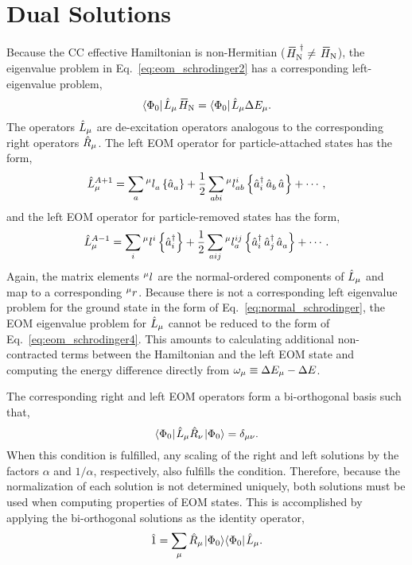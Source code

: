 \documentclass[thesis.tex]{subfiles}
\begin{document}
\section{Dual Solutions} \label{section:eom_dual}

Because the CC effective Hamiltonian is non-Hermitian ($\EHamN^{\dagger} \neq \EHamN$), the eigenvalue problem in Eq.\ \eqref{eq:eom_schrodinger2} has a corresponding left-eigenvalue problem,
\begin{equation} \label{eq:eom_dual1}
  \refbra\Lop_{\mu}\EHamN = \refbra\Lop_{\mu}\Ecorr_{\mu}.
\end{equation}
The operators $\hat{L}\hspace{-0.1pt}_{\mu}$ are de-excitation operators analogous to the corresponding right operators $\hat{R}\hspace{-0.1pt}_{\mu}$.  The left EOM operator for particle-attached states has the form,
\begin{equation} \label{eq:pa_left}
  \hat{L}\hspace{-0.1pt}^{A+1}_{\mu} = \sum_{a}{}^{\mu}l^{\hspace{0.1pt}}_{a}\left\{\mathop{\hat{a}^{}_{a}}\right\} + \frac{1}{2}\sum_{abi}{}^{\mu}l^{\hspace{0.1pt}i}_{ab}\left\{\mathop{\hat{a}^{\dagger}_{i}}\mathop{\hat{a}^{}_{b}}\mathop{\hat{a}^{}_{}}\right\} + \cdots,
\end{equation}
and the left EOM operator for particle-removed states has the form,
\begin{equation} \label{eq:pr_left}
  \hat{L}\hspace{-0.1pt}^{A-1}_{\mu} = \sum_{i}{}^{\mu}l^{\hspace{0.1pt}i}_{}\left\{\mathop{\hat{a}^{\dagger}_{i}}\right\} + \frac{1}{2}\sum_{aij}{}^{\mu}l^{\hspace{0.1pt}ij}_{a}\left\{\mathop{\hat{a}^{\dagger}_{i}}\mathop{\hat{a}^{\dagger}_{j}}\mathop{\hat{a}^{}_{a}}\right\} + \cdots.
\end{equation}
Again, the matrix elements ${}^{\mu}l^{\hspace{0.1pt}}_{}$ are the normal-ordered components of $\hat{L}\hspace{-0.1pt}_{\mu}$ and map to a corresponding ${}^{\mu}r^{}_{}$.  Because there is not a corresponding left eigenvalue problem for the ground state in the form of Eq.\ \eqref{eq:normal_schrodinger}, the EOM eigenvalue problem for $\hat{L}\hspace{-0.1pt}_{\mu}$ cannot be reduced to the form of Eq.\ \eqref{eq:eom_schrodinger4}.  This amounts to calculating additional non-contracted terms between the Hamiltonian and the left EOM state and computing the energy difference directly from $\omega_{\mu} \equiv \Delta E_{\mu} - \Delta E$.

The corresponding right and left EOM operators form a bi-orthogonal basis such that,
\begin{equation}
  \langle \Phi_{0} |\hspace{1pt}\hat{L}\hspace{-0.1pt}_{\mu}\hat{R}\hspace{-0.1pt}_{\nu}\hspace{1pt}\lvert \Phi_{0} \rangle = \delta_{\mu\nu}.
\end{equation}
When this condition is fulfilled, any scaling of the right and left solutions by the factors $\alpha$ and $1/\alpha$, respectively, also fulfills the condition.  Therefore, because the normalization of each solution is not determined uniquely, both solutions must be used when computing properties of EOM states.  This is accomplished by applying the bi-orthogonal solutions as the identity operator,
\begin{gather}
  \hat{1} = \sum_{\mu} \hat{R}\hspace{-0.1pt}_{\mu}\hspace{1pt}\lvert \Phi_{0} \rangle\langle \Phi_{0} |\hspace{1pt}\hat{L}\hspace{-0.1pt}_{\mu}.
\end{gather}
\end{document}
